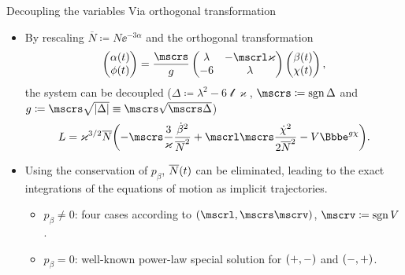 \documentclass[8pt]{beamer}
\begin{document}
\begin{frame}%
{Decoupling the variables}%
{Via orthogonal transformation}
\begin{itemize}
\item By rescaling $\overline{N} \coloneqq N\ee^{-3\alpha}$ and
%
the orthogonal transformation
\begin{align}
\begin{pmatrix}
\rfun{\alpha}{t} \\ \rfun{\phi}{t}
\end{pmatrix} = \frac{\mscrs}{g}
\begin{pmatrix}
\lambda & -\mscrl\varkappa \\
-6 & \lambda
\end{pmatrix}
\begin{pmatrix}
\rfun{\beta}{t} \\ \rfun{\chi}{t}
\end{pmatrix},
\end{align}
the system can be decoupled
($\Delta \coloneqq \lambda^2 - 6\mscrl\varkappa$,
\textcolor{blue}{$\mscrs \coloneqq \sgn \Delta$} and
$g \coloneqq \mscrs \sqrt{\vbr{\Delta}} \equiv \mscrs\sqrt{\mscrs\Delta}$)
\begin{align}
L = \varkappa^{3/2}\overline{N}
\rbr{-\mscrs\frac{3}{\varkappa}\frac{\dot{\beta}^2}{\overline{N}^2}
+\mscrl\mscrs\frac{\dot{\chi}^2}{2\overline{N}^2}
-V\ee^{g \chi}}.
\label{eq:lagrangian-decoupled}
\end{align}

\item Using the \alert{conservation of $p_\beta$}, ${\overline{N}}\mathopen{}\left(t\right)\mathclose{}$ can be eliminated, 
leading to the exact integrations of the equations of motion as \alert{implicit 
trajectories}.
\begin{itemize}
\item $p_\beta \neq 0$: four cases according to $\rbr{\mscrl, \mscrs \mscrv}$,
\textcolor{blue}{$\mscrv \coloneqq \sgn V$}.
\item $p_\beta = 0$: well-known power-law special solution for ${\left(+,-\right)}$ 
and ${\left(-,+\right)}$.
\end{itemize}


\end{itemize}
\end{frame}
\end{document}
